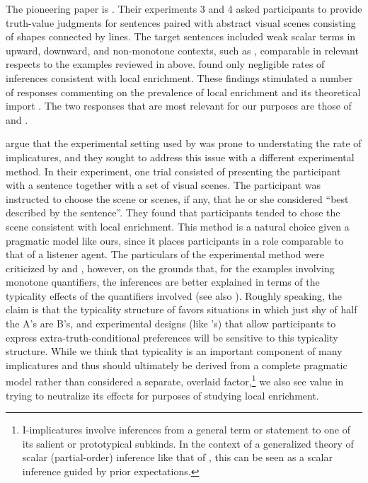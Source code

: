 \documentclass[leqno,12pt]{article}
\begin{document}
The pioneering paper is \citealt{Geurts:Pouscoulous:2009}. Their
experiments 3 and 4 asked participants to provide truth-value
judgments for sentences paired with abstract visual scenes consisting
of shapes connected by lines. The target sentences included weak
scalar terms in upward, downward, and non-monotone contexts, such as
, comparable in relevant respects to the examples reviewed
in  above.
\citeauthor{Geurts:Pouscoulous:2009} found only negligible rates of
inferences consistent with local enrichment. These findings stimulated
a number of responses commenting on the prevalence of local enrichment
and its theoretical import \citep{Ippolito:2010,Sauerland:2010}. The
two responses that are most relevant for our purposes are those of
\citet{Clifton:Dube:2010} and \citet{Chemla:Spector:2011}.

\citet{Clifton:Dube:2010} argue that the experimental setting used by
\citeauthor{Geurts:Pouscoulous:2009} was prone to understating the
rate of implicatures, and they sought to address this issue with a
different experimental method.  In their experiment, one trial
consisted of presenting the participant with a sentence together with
a set of visual scenes.  The participant was instructed to choose the
scene or scenes, if any, that he or she considered ``best described by
the sentence''.  They found that participants tended to chose the
scene consistent with local enrichment. This method is a natural
choice given a pragmatic model like ours, since it places participants
in a role comparable to that of a listener agent. The particulars of
the experimental method were criticized by
 and \citet{vanTiel:2014},
however, on the grounds that, for the examples involving monotone
quantifiers, the inferences are better explained in terms of the
typicality effects of the quantifiers involved (see also
\citealp{Degen:Tanenhaus:2014}).  Roughly speaking, the claim is that
the typicality structure of  favors situations in
which just shy of half the A's are B's, and experimental designs (like
\citeauthor{Clifton:Dube:2010}'s) that allow participants to express
extra-truth-conditional preferences will be sensitive to this
typicality structure. While we think that typicality is an important
component of many implicatures and thus should ultimately be derived
from a complete pragmatic model rather than considered a separate,
overlaid factor,\footnote{ I-implicatures
  involve inferences from a general term or statement to one of its
  salient or prototypical subkinds. In the context of a generalized
  theory of scalar (partial-order) inference like that of
  \citet{Hirschberg85}, this can be seen as a scalar inference guided
  by prior expectations.} we also see value in trying to neutralize
its effects for purposes of studying local enrichment.
\end{document}
